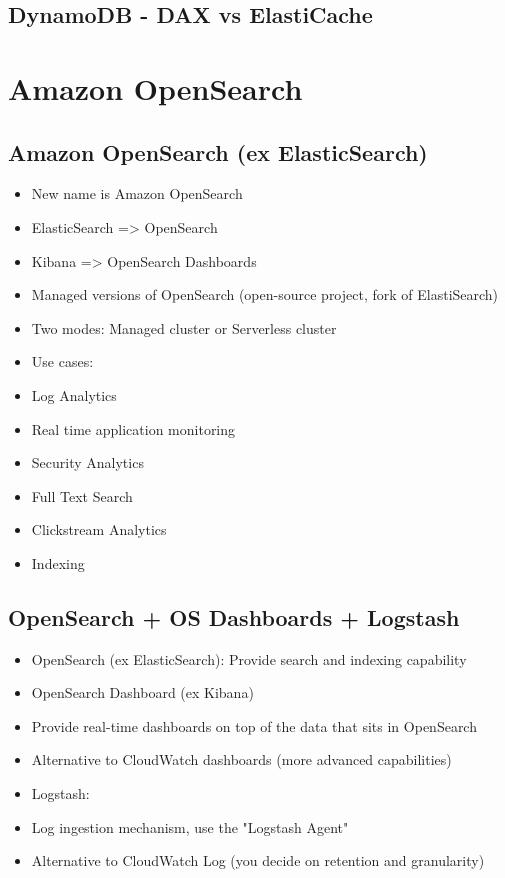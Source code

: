 \subsection{DynamoDB - DAX vs ElastiCache}


\section{Amazon OpenSearch}

\subsection{Amazon OpenSearch (ex ElasticSearch)}
\begin{itemize}
    \item New name is Amazon OpenSearch
    \item ElasticSearch => OpenSearch
    \item Kibana => OpenSearch Dashboards
    \item Managed versions of OpenSearch (open-source project, fork of ElastiSearch)
    \item Two modes: Managed cluster or Serverless cluster
    \item Use cases:
    \item Log Analytics
    \item Real time application monitoring
    \item Security Analytics
    \item Full Text Search
    \item Clickstream Analytics
    \item Indexing
\end{itemize}

\subsection{OpenSearch + OS Dashboards + Logstash}
\begin{itemize}
    \item OpenSearch (ex ElasticSearch): Provide search and indexing capability
    \item OpenSearch Dashboard (ex Kibana)
    \item Provide real-time dashboards on top of the data that sits in OpenSearch
    \item Alternative to CloudWatch dashboards (more advanced capabilities)
    \item Logstash:
    \item Log ingestion mechanism, use the "Logstash Agent"
    \item Alternative to CloudWatch Log (you decide on retention and granularity)
\end{itemize}

